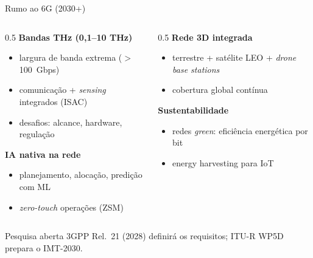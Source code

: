 \documentclass[aspectratio=169,11pt]{beamer}
\begin{document}
\begin{frame}{Rumo ao 6G (2030+)}
  \begin{columns}
    \begin{column}{0.5\textwidth}
      \textbf{Bandas THz (0,1--10 THz)}
      \begin{itemize}
        \item largura de banda extrema ($>$ 100~Gbps)
        \item comunicação + \emph{sensing} integrados (ISAC)
        \item desafios: alcance, hardware, regulação
      \end{itemize}
      \textbf{IA nativa na rede}
      \begin{itemize}
        \item planejamento, alocação, predição com ML
        \item \emph{zero-touch} operações (ZSM)
      \end{itemize}
    \end{column}
    \begin{column}{0.5\textwidth}
      \textbf{Rede 3D integrada}
      \begin{itemize}
        \item terrestre + satélite LEO + \emph{drone base stations}
        \item cobertura global contínua
      \end{itemize}
      \textbf{Sustentabilidade}
      \begin{itemize}
        \item redes \emph{green}: eficiência energética por bit
        \item energy harvesting para IoT
      \end{itemize}
    \end{column}
  \end{columns}
  \begin{exampleblock}{Pesquisa aberta}
    3GPP Rel.\ 21 (2028) definirá os requisitos; ITU-R WP5D prepara o IMT-2030.
  \end{exampleblock}
\end{frame}
\end{document}
